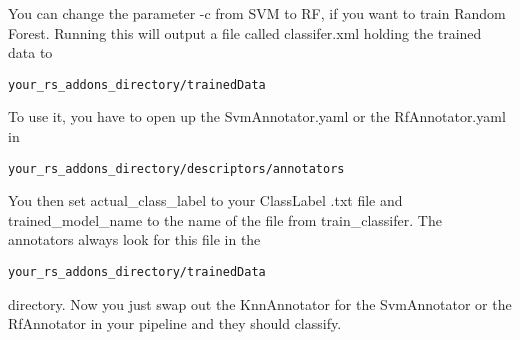 \documentclass[main.tex]{subfiles}
\begin{document}
You can change the parameter -c from SVM to RF, if you want to train Random Forest. Running this will output a file called classifer.xml holding the trained data to 
\begin{lstlisting}
your_rs_addons_directory/trainedData
\end{lstlisting}

To use it, you have to open up the SvmAnnotator.yaml or the RfAnnotator.yaml in

\begin{lstlisting}
your_rs_addons_directory/descriptors/annotators
\end{lstlisting}

You then set actual\_class\_label to your ClassLabel .txt file and trained\_model\_name to the name of the file from train\_classifer. The annotators always look for this file in the

\begin{lstlisting}
your_rs_addons_directory/trainedData
\end{lstlisting}

directory. Now you just swap out the KnnAnnotator for the SvmAnnotator or the RfAnnotator in your pipeline and they should classify.

 
\end{document}
